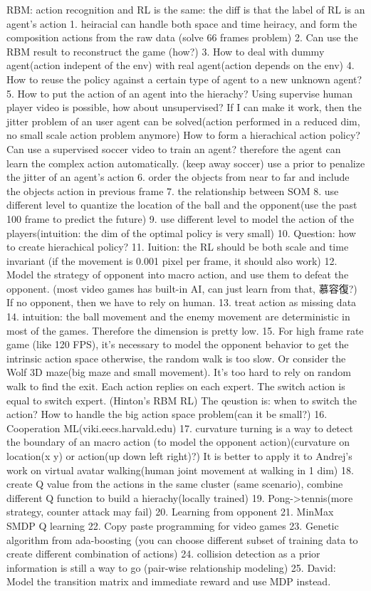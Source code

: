 RBM:
action recognition and RL is the same: the diff is that the label of RL is an agent's action
1. heiracial can handle both space and time heiracy, and form the composition actions from the raw data
(solve 66 frames problem)
2. Can use the RBM result to reconstruct the game (how?) 
3. How to deal with dummy agent(action indepent of the env) with real agent(action depends on the env)
4. How to reuse the policy against a certain type of agent to a new unknown agent?
5. How to put the action of an agent into the hierachy? Using supervise human player video is possible, how about unsupervised?
If I can make it work, then the jitter problem of an user agent can be solved(action performed in a reduced dim, no small scale action problem anymore)
How to form a hierachical action policy?
Can use a supervised soccer video to train an agent? therefore the agent can learn the complex action automatically. (keep away soccer)
use a prior to penalize the jitter of an agent's action
6. order the objects from near to far and include the objects action in previous frame
7. the relationship between SOM
8. use different level to quantize the location of the ball and the opponent(use the past 100 frame to predict the future)
9. use different level to model the action of the players(intuition: the dim of the optimal policy is very small)
10. Question: how to create hierachical policy?
11. Iuition: the RL should be both scale and time invariant (if the movement is 0.001 pixel per frame, it should also work)
12. Model the strategy of opponent into macro action, and use them to defeat the opponent. (most video games has built-in AI, can just learn from that, 慕容復?)
If no opponent, then we have to rely on human.
13. treat action as missing data
14. intuition: the ball movement and the enemy movement are deterministic in most of the games. Therefore the dimension is pretty low.
15. For high frame rate game (like 120 FPS), it's necessary to model the opponent behavior to get the intrinsic action space
otherwise, the random walk is too slow. Or consider the Wolf 3D maze(big maze and small movement). It's too hard to rely on random walk to find the exit.
Each action replies on each expert. The switch action is equal to switch expert. (Hinton's RBM RL)
The qeustion is: when to switch the action? How to handle the big action space problem(can it be small?)
16. Cooperation ML(viki.eecs.harvald.edu)
17. curvature turning is a way to detect the boundary of an macro action (to model the opponent action)(curvature on location(x y) or action(up down left right)?)
It is better to apply it to Andrej's work on virtual avatar walking(human joint movement at walking in 1 dim)
18. create Q value from the actions in the same cluster (same scenario), combine different Q function to build a hierachy(locally trained)
19. Pong->tennis(more strategy, counter attack may fail)
20. Learning from opponent
21. MinMax SMDP Q learning
22. Copy paste programming for video games
23. Genetic algorithm from ada-boosting (you can choose different subset of training data to create different combination 
of actions)
24. collision detection as a prior information is still a way to go (pair-wise relationship modeling)
25. David: Model the transition matrix and immediate reward and use MDP instead.
